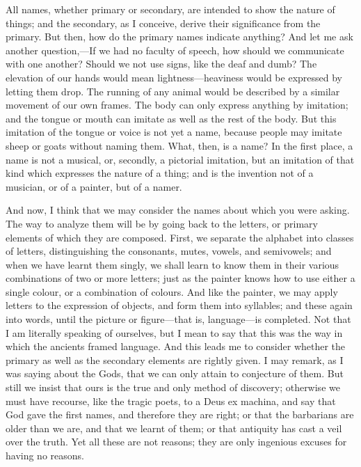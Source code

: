 \documentclass[11pt,letter]{article}
\begin{document}
\par  All names, whether primary or secondary, are intended to show the nature of things; and the secondary, as I conceive, derive their significance from the primary. But then, how do the primary names indicate anything? And let me ask another question,—If we had no faculty of speech, how should we communicate with one another? Should we not use signs, like the deaf and dumb? The elevation of our hands would mean lightness—heaviness would be expressed by letting them drop. The running of any animal would be described by a similar movement of our own frames. The body can only express anything by imitation; and the tongue or mouth can imitate as well as the rest of the body. But this imitation of the tongue or voice is not yet a name, because people may imitate sheep or goats without naming them. What, then, is a name? In the first place, a name is not a musical, or, secondly, a pictorial imitation, but an imitation of that kind which expresses the nature of a thing; and is the invention not of a musician, or of a painter, but of a namer.

\par  And now, I think that we may consider the names about which you were asking. The way to analyze them will be by going back to the letters, or primary elements of which they are composed. First, we separate the alphabet into classes of letters, distinguishing the consonants, mutes, vowels, and semivowels; and when we have learnt them singly, we shall learn to know them in their various combinations of two or more letters; just as the painter knows how to use either a single colour, or a combination of colours. And like the painter, we may apply letters to the expression of objects, and form them into syllables; and these again into words, until the picture or figure—that is, language—is completed. Not that I am literally speaking of ourselves, but I mean to say that this was the way in which the ancients framed language. And this leads me to consider whether the primary as well as the secondary elements are rightly given. I may remark, as I was saying about the Gods, that we can only attain to conjecture of them. But still we insist that ours is the true and only method of discovery; otherwise we must have recourse, like the tragic poets, to a Deus ex machina, and say that God gave the first names, and therefore they are right; or that the barbarians are older than we are, and that we learnt of them; or that antiquity has cast a veil over the truth. Yet all these are not reasons; they are only ingenious excuses for having no reasons.
\end{document}
